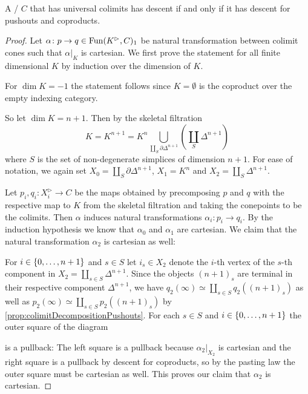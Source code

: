 \begin{lemma}\label{lem:descentIffDescentPoAndCoprod}
    A \inftycat/ $C$ that has universal colimits has descent if and only if it has descent for pushouts and coproducts.
    \begin{proof}
        Let $\alpha\colon p\to q\in\operatorname{Fun}(K^{\rhd},C)_1$ be natural transformation between colimit cones such that $\alpha|_K$ is cartesian.
        We first prove the statement for all finite dimensional $K$ by induction over the dimension of $K$.

        For $\dim K=-1$ the statement follows since $K=\emptyset$ is the coproduct over the empty indexing category.

        So let $\dim K=n+1$.
        Then by the skeletal filtration
        \begin{equation*}
            K=K^{n+1}=K^n\bigcup\limits_{\coprod\limits_S \partial\Delta^{n+1}}\left(\coprod_S \Delta^{n+1}\right)
        \end{equation*}
        where $S$ is the set of non-degenerate simplices of dimension $n+1$.
        For ease of notation, we again set $X_{0}=\coprod\limits_S \partial\Delta^{n+1}$, $X_1=K^n$ and $X_2=\coprod\limits_S \Delta^{n+1}$.
        
        Let $p_i,q_i\colon X_i^{\rhd}\to C$ be the maps obtained by precomposing $p$ and $q$ with the respective map to $K$ from the skeletal filtration and taking the conepoints to be the colimits.
        Then $\alpha$ induces natural transformations $\alpha_i\colon p_i\to q_i$.
        By the induction hypothesis we know that $\alpha_0$ and $\alpha_1$ are cartesian.
        We claim that the natural transformation $\alpha_2$ is cartesian as well: 

        For $i\in\left\lbrace0,\ldots,n+1\right\rbrace$ and $s\in S$ let $i_s\in X_2$ denote the $i$-th vertex of the $s$-th component in $X_2=\coprod\limits_{s\in S} \Delta^{n+1}$.
        Since the objects $(n+1)_s$ are terminal in their respective component $\Delta^{n+1}$, we have $q_2(\infty)\simeq\coprod\limits_{s\in S} q_2((n+1)_s)$ as well as $p_2(\infty)\simeq\coprod\limits_{s\in S} p_2((n+1)_s)$ by \cref{prop:colimitDecompositionPushouts}.
        For each $s\in S$ and $i\in\left\lbrace0,\ldots,n+1\right\rbrace$ the outer square of the diagram
        \begin{center}
        \end{center}
        is a pullback: The left square is a pullback because $\alpha_2|_{X_2}$ is cartesian and the right square is a pullback by descent for coproducts, so by the pasting law the outer square must be cartesian as well.
        This proves our claim that $\alpha_2$ is cartesian.


\end{proof}
\end{lemma}
